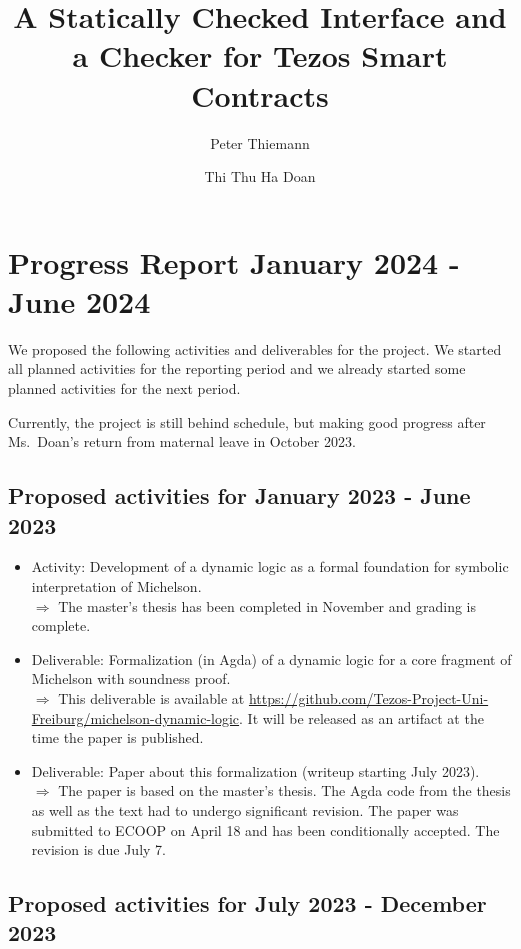 \documentclass[a4paper,11pt]{article}
\title{A Statically Checked Interface and a Checker for Tezos Smart Contracts}
\author{Peter Thiemann}
\author{Thi Thu Ha Doan}
\affil{University of Freiburg, Germany}
\begin{document}
\maketitle{}

\section{Progress Report January 2024 - June 2024}
\label{sec:executive-summary}

We proposed the following activities and deliverables for the
project. We started all planned activities for the reporting period
and we already started some planned activities for the next period.

Currently, the project is still behind schedule, but making good
progress after Ms.\ Doan's return from  maternal leave in October 2023.

\subsection{Proposed activities for January 2023 - June 2023}

\begin{itemize}
\item Activity: Development of a dynamic logic as a formal foundation for symbolic interpretation of Michelson. \\
  $\Rightarrow$  The master's thesis has been completed in November and grading is complete.
\item Deliverable: Formalization (in Agda) of a dynamic logic for a core fragment of Michelson with soundness proof. \\
  $\Rightarrow$ This deliverable is available  at
  \url{https://github.com/Tezos-Project-Uni-Freiburg/michelson-dynamic-logic}. It will be
  released as an artifact at the time the paper is published.
\item Deliverable: Paper about this formalization (writeup starting
  July 2023). \\
  $\Rightarrow$ The paper is based on the master's thesis. The Agda code
  from the thesis as well as the text had to undergo significant
  revision. The paper was submitted to ECOOP on April 18 and has been
  conditionally accepted. The revision is due July 7.
\end{itemize}

\subsection{Proposed activities for July 2023 - December 2023}
\label{sec:july-2023-december}
\end{document}
